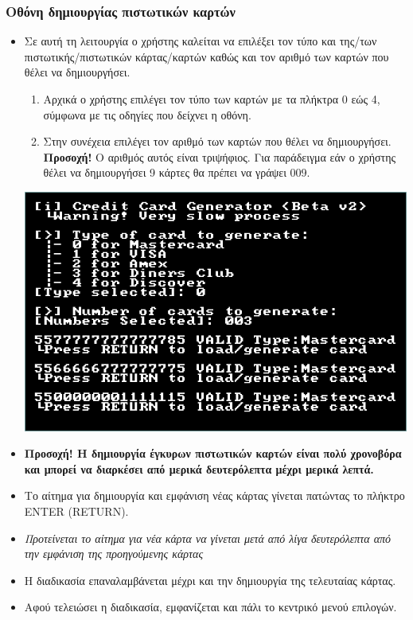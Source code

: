 \documentclass[10pt,a4paper]{article}
\begin{document}
\subsubsection*{Οθόνη δημιουργίας πιστωτικών καρτών}
\begin{itemize}
\item Σε αυτή τη λειτουργία ο χρήστης καλείται να επιλέξει τον τύπο και της/των πιστωτικής/πιστωτικών κάρτας/καρτών καθώς και τον αριθμό των καρτών που θέλει να δημιουργήσει.
	\begin{enumerate}
	\item Αρχικά ο χρήστης επιλέγει τον τύπο των καρτών με τα πλήκτρα 0 εώς 4, σύμφωνα με τις οδηγίες που δείχνει η οθόνη.
	\item Στην συνέχεια επιλέγει τον αριθμό των καρτών που θέλει να δημιουργήσει. \textbf{Προσοχή!} Ο αριθμός αυτός είναι τριψήφιος. Για παράδειγμα εάν ο χρήστης θέλει να δημιουργήσει 9 κάρτες θα πρέπει να γράψει 009.	
	\end{enumerate}
	
\includegraphics[scale=0.75]{cload.PNG}

\item \textbf{Προσοχή! Η δημιουργία έγκυρων πιστωτικών καρτών είναι πολύ χρονοβόρα και μπορεί να διαρκέσει από μερικά δευτερόλεπτα μέχρι μερικά λεπτά.} 
\item Το αίτημα για δημιουργία και εμφάνιση νέας κάρτας γίνεται πατώντας το πλήκτρο \latintext ENTER (RETURN)\greektext.
\item \textit{Προτείνεται το αίτημα για νέα κάρτα να γίνεται μετά από λίγα δευτερόλεπτα από την εμφάνιση της προηγούμενης κάρτας}
\item Η διαδικασία επαναλαμβάνεται μέχρι και την δημιουργία της τελευταίας κάρτας.
\item Αφού τελειώσει η διαδικασία, εμφανίζεται και πάλι το κεντρικό μενού επιλογών.
\end{itemize}
\end{document}
